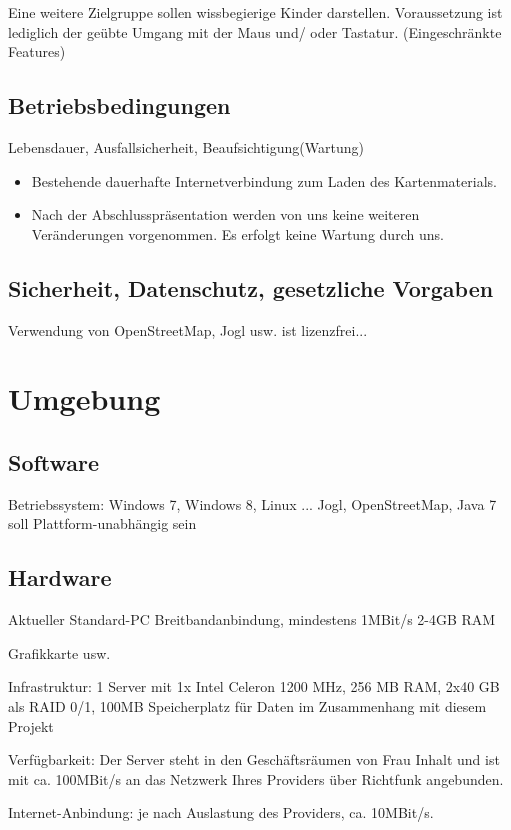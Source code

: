 \documentclass[10pt]{report}
\begin{document}
Eine weitere Zielgruppe sollen wissbegierige Kinder darstellen. Voraussetzung ist lediglich der geübte Umgang mit der Maus und/ oder Tastatur. (Eingeschränkte Features)

\section{Betriebsbedingungen}
Lebensdauer, Ausfallsicherheit, Beaufsichtigung(Wartung)

\begin{itemize}
\item Bestehende dauerhafte Internetverbindung zum Laden des Kartenmaterials.
\item Nach  der  Abschlusspräsentation  werden  von  uns  keine  weiteren 
Veränderungen vorgenommen. Es erfolgt keine Wartung durch uns.
\end{itemize} 

\section{Sicherheit, Datenschutz, gesetzliche Vorgaben}
Verwendung von OpenStreetMap, Jogl usw. ist lizenzfrei...


\chapter{Umgebung}
\section{Software}
Betriebssystem: Windows 7, Windows 8, Linux ...
Jogl, OpenStreetMap, Java 7
soll Plattform-unabhängig sein

\section{Hardware}
Aktueller Standard-PC
Breitbandanbindung, mindestens 1MBit/s
2-4GB RAM

Grafikkarte usw.

Infrastruktur: 1 Server mit 1x Intel Celeron 1200 MHz, 256 MB RAM, 2x40 
GB als RAID 0/1, 100MB Speicherplatz für Daten im Zusammenhang mit 
diesem Projekt 

Verfügbarkeit:  Der  Server  steht  in  den  Geschäftsräumen  von  Frau  Inhalt 
und ist mit ca. 100MBit/s an das Netzwerk Ihres Providers über Richtfunk 
angebunden. 

Internet-Anbindung: je nach Auslastung des Providers, ca. 10MBit/s. 
\end{document}
